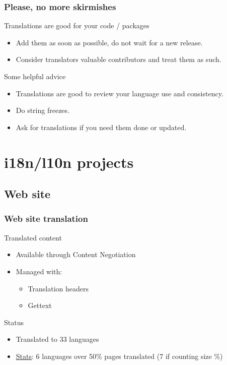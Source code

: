 \documentclass{beamer}
\begin{document}
\begin{frame}
  \frametitle{Please, no more skirmishes}
	\begin{block}
		{Translations are good for your code / packages}
		\begin{itemize}
		\item Add them as soon as possible, do not wait for a new release.
		\item Consider translators valuable contributors and treat them as such.
		\end{itemize}
	\end{block}
	\begin{block}
		{Some helpful advice}
		\begin{itemize}
		\item Translations are good to review your language use and consistency.
		\item Do string freezes.
		\item Ask for translations if you need them done or updated.
		\end{itemize}
	\end{block}
\end{frame}


\section{i18n/l10n projects}

\subsection{Web site}

\begin{frame}
  \frametitle{Web site translation}
	\begin{block}
		{Translated content}
		\begin{itemize}
		\item Available through Content Negotiation
		\item Managed with:
		\begin{itemize}
		\item Translation headers
		\item Gettext
		\end{itemize}
		\end{itemize}
	\end{block}
	\begin{block}
		{Status}
		\begin{itemize}
		\item Translated to 33 languages
		\item \href{http://www.debian.org/devel/website/stats}{Stats}: 6 languages over 50\% pages translated (7 if counting size \%)
		\end{itemize}
	\end{block}
\end{frame}
\end{document}
